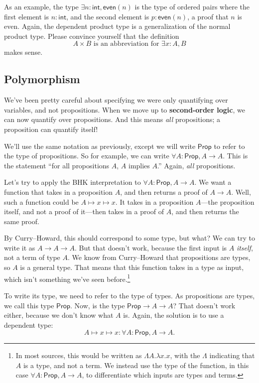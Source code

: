 \documentclass[11pt,paper=letter]{scrartcl}
\newcommand{\sf}{\mathsf}
\newcommand{\prop}{\mathsf{Prop}}
\begin{document}
As an example, the type $\exists n: \sf{int}, \sf{even}(n)$ is the type of ordered pairs where the first element is $n : \sf{int}$, and the second element is $p : \sf{even}(n)$, a proof that $n$ is even. Again, the dependent product type is a generalization of the normal product type. Please convince yourself that the definition \[
  A \times B \text{ is an abbreviation for } \exists x: A, B
\]
makes sense.

\subsection{Polymorphism}

We've been pretty careful about specifying we were only quantifying over variables, and not propositions. When we move up to \textbf{second-order logic}, we can now quantify over propositions. And this means \emph{all} propositions; a proposition can quantify itself!

We'll use the same notation as previously, except we will write $\prop$ to refer to the type of propositions. So for example, we can write $\forall A: \prop, A \to A$. This is the statement ``for all propositions $A$, $A$ implies $A$.'' Again, \emph{all} propositions.

Let's try to apply the BHK interpretation to $\forall A: \prop, A \to A$. We want a function that takes in a proposition $A$, and then returns a proof of $A \to A$. Well, such a function could be $A \mapsto x \mapsto x$. It takes in a proposition $A$---the proposition itself, and not a proof of it---then takes in a proof of $A$, and then returns the same proof.

By Curry--Howard, this should correspond to some type, but what? We can try to write it as $A \to A \to A$. But that doesn't work, because the first input is $A$ \emph{itself}, not a term of type $A$. We know from Curry--Howard that propositions are types, so $A$ is a general type. That means that this function takes in a type as input, which isn't something we've seen before.\footnote{In most sources, this would be written as $\Lambda A . \lambda x. x$, with the $\Lambda$ indicating that $A$ is a type, and not a term. We instead use the type of the function, in this case $\forall A: \prop, A \to A$, to differentiate which inputs are types and terms.}

To write its type, we need to refer to the type of types. As propositions are types, we call this type $\prop$. Now, is the type $\prop \to A \to A$? That doesn't work either, because we don't know what $A$ is. Again, the solution is to use a dependent type: \[
  A \mapsto x \mapsto x : \forall A: \prop, A \to A.
\]
\end{document}
